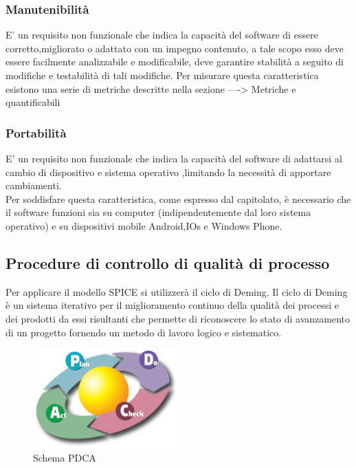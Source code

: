 \subsubsection{Manutenibilità}
E' un requisito non funzionale che indica la capacità del software di essere corretto,migliorato o adattato con un impegno contenuto, a tale scopo esso deve essere facilmente analizzabile e modificabile, deve garantire stabilità a seguito di modifiche e testabilità di tali modifiche. Per misurare questa caratteristica esistono una serie di metriche descritte nella sezione ----> Metriche e quantificabili 

\subsubsection{Portabilità}

E' un requisito non funzionale che indica la capacità del software di adattarsi al cambio di dispositivo e sistema operativo ,limitando la necessità di apportare cambiamenti.\\
Per soddisfare questa caratteristica, come espresso dal capitolato, è necessario che il software funzioni sia su computer (indipendentemente dal loro sistema operativo) e su dispositivi mobile Android,IOs e Windows Phone.

\subsection{Procedure di controllo di qualità di processo}
Per applicare il modello SPICE si utilizzerà il ciclo di Deming. Il ciclo di Deming è un sistema iterativo per il miglioramento continuo della qualità
dei processi e dei prodotti da essi risultanti che permette di riconoscere lo stato di avanzamento di un progetto fornendo un metodo di lavoro logico e sistematico.

\begin{figure}[h]
  \centering
    \includegraphics[width=0.5\textwidth]{./images/deming}
  \caption{Schema PDCA}
  \label{fig:deming}
\end{figure}

